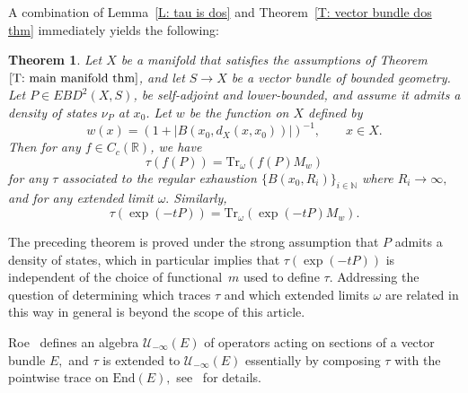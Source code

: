 \documentclass[pdftex]{sigma}
\numberwithin{equation}{section}
\newtheorem{Theorem}{Theorem}[section]
\newcommand{\abs}[1]{\lvert#1\rvert}
\begin{document}
A combination of Lemma~\ref{L: tau is dos} and Theorem~\ref{T: vector bundle dos thm} immediately yields the following:
\begin{Theorem}
Let $X$ be a manifold that satisfies the assumptions of Theorem~$\ref{T: main manifold thm}$, and let $S\to X$ be a vector bundle of bounded geometry. Let $P \in EBD^2(X,S)$, be self-adjoint and lower-bounded, and assume it admits a density of states $\nu_P$ at $x_0$. Let $w$ be the function on $X$ defined by
\[
w(x) = (1+\abs{B(x_0,d_X(x,x_0))})^{-1},\qquad x \in X.
\]
Then for any $f\in C_c(\mathbb{R})$, we have
\[
\tau(f(P)) = \mathrm{Tr}_\omega(f(P)M_w)
\]
for any $\tau$ associated to the regular exhaustion $\{B(x_0,R_i)\}_{i\in \mathbb{N}}$ where $R_i\to\infty,$ and for any extended limit $\omega.$
Similarly,
\[
 \tau(\exp(-tP)) = \mathrm{Tr}_\omega(\exp(-tP)M_w).
\]
\end{Theorem}

The preceding theorem is proved under the strong assumption that $P$ admits a density of states, which in particular implies that $\tau(\exp(-tP))$ is independent of the choice of functional~$m$ used to define $\tau.$ Addressing the question of determining which traces $\tau$ and which extended limits $\omega$ are related in this way in general is beyond the scope of this article.

Roe~\cite{Roe1988a} defines an algebra $\mathcal{U}_{-\infty}(E)$ of operators acting on sections of a vector bundle $E,$ and $\tau$ is extended to $\mathcal{U}_{-\infty}(E)$ essentially by composing $\tau$ with the pointwise trace on $\mathrm{End}(E),$ see~\cite{Roe1988a} for details.
\end{document}
